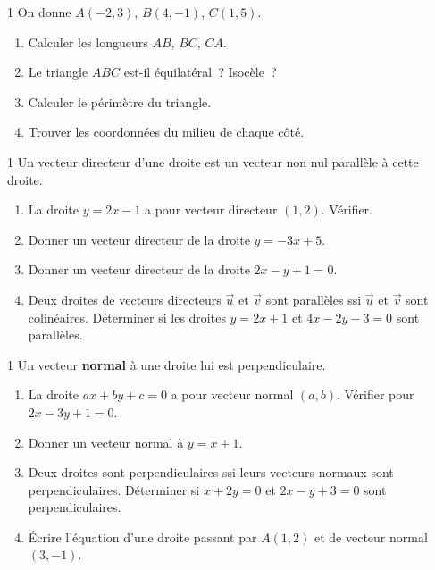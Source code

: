 \begin{exo}{1}
On donne $A(-2,3)$, $B(4,-1)$, $C(1,5)$.
\begin{enumerate}
  \item Calculer les longueurs $AB$, $BC$, $CA$.
  \item Le triangle $ABC$ est-il \'equilat\'eral~? Isoc\`ele~?
  \item Calculer le p\'erim\`etre du triangle.
  \item Trouver les coordonn\'ees du milieu de chaque c\^ot\'e.
\end{enumerate}
\end{exo}

\begin{exo}{1}
Un vecteur directeur d'une droite est un vecteur non nul parall\`ele
\`a cette droite.
\begin{enumerate}
  \item La droite $y = 2x - 1$ a pour vecteur directeur $(1, 2)$.
        V\'erifier.
  \item Donner un vecteur directeur de la droite $y = -3x + 5$.
  \item Donner un vecteur directeur de la droite $2x - y + 1 = 0$.
  \item Deux droites de vecteurs directeurs $\vec{u}$ et $\vec{v}$
        sont parall\`eles ssi $\vec{u}$ et $\vec{v}$ sont colin\'eaires.
        D\'eterminer si les droites $y=2x+1$ et $4x-2y-3=0$ sont parall\`eles.
\end{enumerate}
\end{exo}

\begin{exo}{1}
Un vecteur \textbf{normal} \`a une droite lui est perpendiculaire.
\begin{enumerate}
  \item La droite $ax+by+c=0$ a pour vecteur normal $(a,b)$.
        V\'erifier pour $2x-3y+1=0$.
  \item Donner un vecteur normal \`a $y = x+1$.
  \item Deux droites sont perpendiculaires ssi leurs vecteurs normaux sont
        perpendiculaires. D\'eterminer si $x+2y=0$ et $2x-y+3=0$ sont perpendiculaires.
  \item \'Ecrire l'\'equation d'une droite passant par $A(1,2)$ et
        de vecteur normal $(3,-1)$.
\end{enumerate}
\end{exo}

